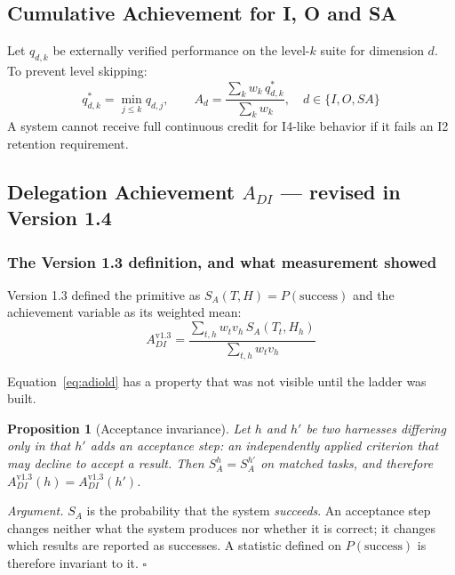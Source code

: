 \documentclass[11pt]{article}
\newtheorem{proposition}{Proposition}
\theoremstyle{definition}
\newcommand{\SA}{\ensuremath{S_A(T,H)}}
\begin{document}
\subsection{Cumulative Achievement for I, O and SA}

Let $q_{d,k}$ be externally verified performance on the level-$k$ suite for dimension $d$. To prevent level skipping:
\begin{equation}
q^{*}_{d,k} = \min_{j \le k} q_{d,j}, \qquad
A_d = \frac{\sum_k w_k\, q^{*}_{d,k}}{\sum_k w_k}, \quad d \in \{I,O,SA\}
\end{equation}
A system cannot receive full continuous credit for I4-like behavior if it fails an I2 retention requirement.

\subsection{Delegation Achievement $A_{DI}$ --- revised in Version 1.4}\label{sec:adi}

\subsubsection{The Version 1.3 definition, and what measurement showed}

Version 1.3 defined the primitive as $\SA{} = P(\text{success})$ and the achievement variable as its weighted mean:
\begin{equation}
A_{DI}^{\text{v1.3}} = \frac{\sum_{t,h} w_t v_h\, S_A(T_t,H_h)}{\sum_{t,h} w_t v_h}
\label{eq:adiold}
\end{equation}

Equation~\eqref{eq:adiold} has a property that was not visible until the ladder was built.

\begin{proposition}[Acceptance invariance]\label{prop:blind}
Let $h$ and $h'$ be two harnesses differing only in that $h'$ adds an acceptance step: an independently applied criterion that may decline to accept a result. Then $S_A^{h} = S_A^{h'}$ on matched tasks, and therefore $A_{DI}^{\text{v1.3}}(h) = A_{DI}^{\text{v1.3}}(h')$.
\end{proposition}

\emph{Argument.} $S_A$ is the probability that the system \emph{succeeds}. An acceptance step changes neither what the system produces nor whether it is correct; it changes which results are reported as successes. A statistic defined on $P(\text{success})$ is therefore invariant to it. \hfill$\square$
\end{document}
